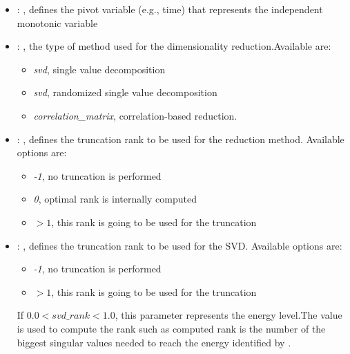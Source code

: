 \begin{itemize}
    \item {}: , 
      defines the pivot variable (e.g., time) that represents the
      independent monotonic variable

    \item {}: , 
      the type of method used for the dimensionality reduction.Available are:
      \begin{itemize}                                                     \item \textit{svd}, single
      value decomposition                                                     \item \textit{svd},
      randomized single value decomposition
      \item \textit{correlation\_matrix}, correlation-based reduction.
      \end{itemize}

    \item {}: , 
      defines the truncation rank to be used for the reduction method.
      Available options are:                                                  \begin{itemize}
      \item \textit{-1}, no truncation is performed
      \item \textit{0}, optimal rank is internally computed
      \item \textit{$>1$}, this rank is going to be used for the truncation
      \end{itemize}

    \item {}: , 
      defines the truncation rank to be used for the SVD.
      Available options are:                                                  \begin{itemize}
      \item \textit{-1}, no truncation is performed
      \item \textit{$>1$}, this rank is going to be used for the truncation
      \end{itemize}                                                  If $0.0 < svd\_rank < 1.0$,
      this parameter represents the energy level.The value is used to compute the rank such
      as computed rank is the number of the biggest singular values needed to reach the energy
      identified by                                                    .


\end{itemize}
